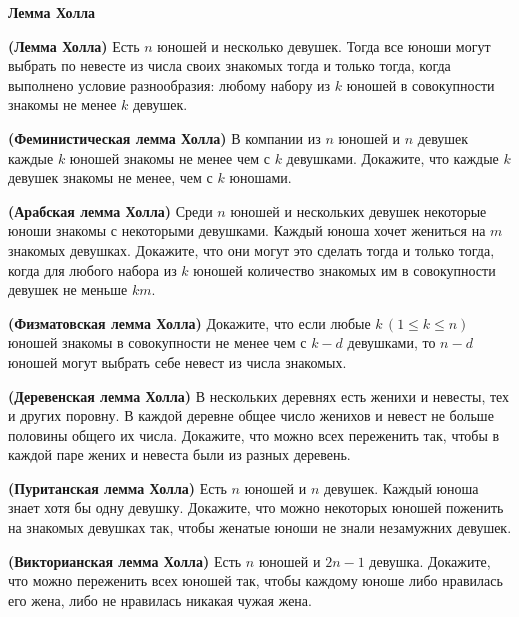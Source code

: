 \documentclass{article}
\begin{document}
    \large

    \begin{center}
        \textbf{Лемма Холла}
    \end{center}

    \begin{enumerate_boxed}

        \item \textbf{(Лемма Холла)} Есть $n$ юношей и несколько девушек.
        Тогда все юноши могут выбрать по невесте из числа своих знакомых тогда и только тогда, когда выполнено условие разнообразия: любому набору из $k$ юношей в совокупности знакомы не менее $k$ девушек.


        \item \textbf{(Феминистическая лемма Холла)} В компании из $n$ юношей и $n$ девушек каждые $k$ юношей знакомы не менее чем с $k$ девушками.
        Докажите, что каждые $k$ девушек знакомы не менее, чем с $k$ юношами.


        \item \textbf{(Арабская лемма Холла)} Среди $n$ юношей и нескольких девушек некоторые юноши знакомы с некоторыми девушками.
        Каждый юноша хочет жениться на $m$ знакомых девушках.
        Докажите, что они могут это сделать тогда и только тогда, когда для любого набора из $k$ юношей количество знакомых им в совокупности девушек не меньше
        $km$.


        \item \textbf{(Физматовская лемма Холла)} Докажите, что если
        любые $k\, (1 \leqslant k \leqslant n)$ юношей знакомы в совокупности не менее чем с $k - d$ девушками, то $n - d$ юношей могут выбрать себе невест из числа знакомых.


        \item \textbf{(Деревенская лемма Холла)} В нескольких деревнях
        есть женихи и невесты, тех и других поровну.
        В каждой деревне общее число женихов и невест не больше половины общего их числа.
        Докажите, что можно всех переженить так, чтобы в каждой паре жених и невеста были из разных деревень.


        \item \textbf{(Пуританская лемма Холла)} Есть $n$ юношей и $n$ девушек.
        Каждый юноша знает хотя бы одну девушку.
        Докажите, что можно некоторых юношей поженить на знакомых девушках так, чтобы женатые юноши не знали незамужних девушек.


        \item \textbf{(Викторианская лемма Холла)} Есть $n$ юношей и
        $2n - 1$ девушка.
        Докажите, что можно переженить всех юношей так, чтобы каждому юноше либо нравилась его жена, либо не нравилась никакая чужая жена.



\end{enumerate_boxed}
\end{document}
